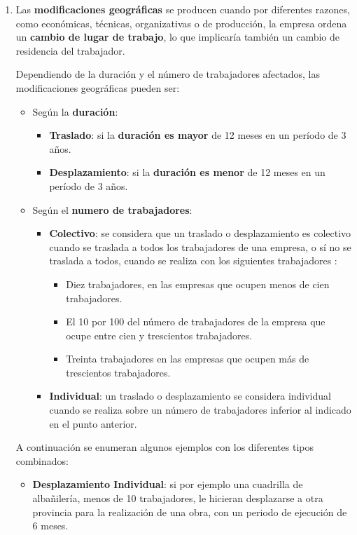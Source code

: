 \begin{enumerate}
\begin{enumerate}
    \item Las \textbf{modificaciones geográficas} se producen cuando por diferentes razones, como económicas, técnicas, organizativas o  de producción, la empresa ordena un \textbf{cambio de lugar de trabajo}, lo que implicaría también un cambio de residencia del trabajador.

    Dependiendo de la duración y el número de trabajadores afectados, las modificaciones geográficas pueden ser:


    \begin{itemize}
        \item Según la \textbf{duración}:
        \begin{itemize}
            \item \textbf{Traslado}: si la \textbf{duración es mayor} de 12 meses en un período de 3 años.
            \item \textbf{Desplazamiento}: si la \textbf{duración es menor}	de 12 meses en un período de 3 años.
        \end{itemize}
        \item Según el \textbf{numero de trabajadores}:
        \begin{itemize}
         \item \textbf{Colectivo}: se considera que un traslado o desplazamiento es colectivo cuando se traslada a todos los trabajadores de una empresa, o sí no se traslada a todos, cuando se realiza con los siguientes trabajadores \cite{mites}:
        \begin{itemize}
            \item Diez trabajadores, en las empresas que ocupen menos de cien trabajadores.
            \item El 10 por 100 del número de trabajadores de la empresa que ocupe entre cien y trescientos trabajadores.
            \item Treinta trabajadores en las empresas que ocupen más de trescientos trabajadores.
        \end{itemize}
        \item \textbf{Individual}: un traslado o desplazamiento se considera individual cuando se realiza sobre un número de trabajadores inferior al indicado en el punto anterior.
        \end{itemize}
    \end{itemize}

    A continuación se enumeran algunos ejemplos con los diferentes tipos combinados:

    \begin{itemize}
        \item \textbf{Desplazamiento Individual}: si por ejemplo una cuadrilla de albañilería, menos de 10 trabajadores, le hicieran desplazarse a otra provincia para la realización de una obra, con un periodo de ejecución de 6 meses.


\end{itemize}
\end{enumerate}
\end{enumerate}
